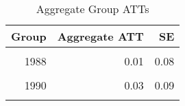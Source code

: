 \begin{table}[!h]

\caption{\label{tab:CSEst}Aggregate Group ATTs}
\centering
\begin{tabular}[t]{rrr}
\toprule
Group & Aggregate ATT & SE\\
\midrule
\cellcolor{gray!6}{1987} & \cellcolor{gray!6}{-0.13} & \cellcolor{gray!6}{0.08}\\
1988 & 0.01 & 0.08\\
\cellcolor{gray!6}{1989} & \cellcolor{gray!6}{-0.03} & \cellcolor{gray!6}{0.31}\\
1990 & 0.03 & 0.09\\
\cellcolor{gray!6}{1991} & \cellcolor{gray!6}{0.48} & \cellcolor{gray!6}{0.09}\\
\bottomrule
\end{tabular}
\end{table}
